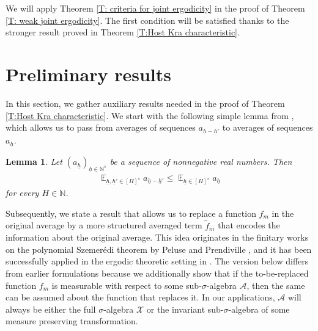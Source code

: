 \documentclass[11pt]{amsart}
\newtheorem{lemma}{Lemma}[section]
\theoremstyle{definition}
\newcommand{\N}{{\mathbb N}}
\newcommand{\CA}{{\mathcal A}}
\newcommand{\CX}{{\mathcal X}}
\newcommand{\uh}{{\underline{h}}}
\DeclareMathOperator*{\E}{\mathbb{E}}
\begin{document}
				We will apply Theorem \ref{T: criteria for joint ergodicity} in the proof of Theorem \ref{T: weak joint ergodicity}. The first condition will be satisfied thanks to the stronger result proved in Theorem \ref{T:Host Kra characteristic}.

\section{Preliminary results}\label{S:lemmas}
In this section, we gather auxiliary results needed in the proof of Theorem \ref{T:Host Kra characteristic}. We start with the following simple lemma from \cite[Lemma~5.2]{FrKu22}, which allows us to pass from averages of sequences $a_{\uh-\uh'}$ to averages of sequences $a_{\uh}$.
\begin{lemma}\label{difference sequences}
Let $(a_\uh)_{\uh\in\N^s}$ be a sequence of nonnegative real numbers. Then
\begin{align*}
    \E_{\uh, \uh'\in[H]^s}a_{\uh-\uh'} \leq \E_{\uh\in[H]^s}a_{\uh}
\end{align*}
for every $H\in\N$.
\end{lemma}
Subsequently, we state a result that allows us to replace a function $f_m$ in the original average by a more structured averaged term $\tilde{f}_m$ that encodes the information about the original average. This idea originates in the finitary works on the polynomial Szemer\'edi theorem by Peluse and Prendiville \cite{P19, P20, PP19}, and it has been successfully applied in the ergodic theoretic setting in \cite{Fr21,  BF22, FrKu22}. The version below differs from earlier formulations because we additionally show that if the to-be-replaced function $f_m$ is measurable with respect to some sub-$\sigma$-algebra $\CA$, then the same can be assumed about the function that replaces it. In our applications, $\CA$ will always be either the full $\sigma$-algebra $\CX$ or the invariant sub-$\sigma$-algebra of some measure preserving transformation.
\end{document}
